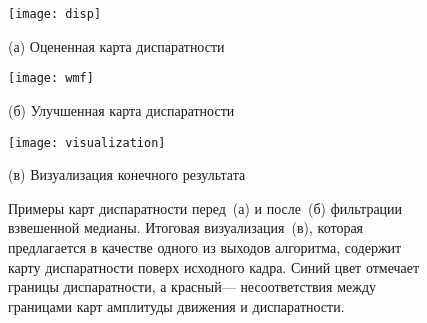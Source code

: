 \begin{figure}[t]
	\begin{minipage}[b]{0.49\linewidth}
		\centering
		\centerline{ \texttt{[image: disp]} }
		\centerline{(а) Оцененная карта диспаратности}\medskip
	\end{minipage}
	\hfill
	\begin{minipage}[b]{0.49\linewidth}
		\centering
		\centerline{\texttt{[image: wmf]} }
		\centerline{(б) Улучшенная карта диспаратности}\medskip
	\end{minipage}
	\begin{minipage}[b]{1\linewidth}
		\centering
		\centerline{\texttt{[image: visualization]} }
		\centerline{(в) Визуализация конечного результата}
	\end{minipage}
    \caption{Примеры карт диспаратности перед~(а) и после~(б) фильтрации 
    	взвешенной медианы. Итоговая визуализация~(в), которая предлагается
    	в качестве одного из выходов алгоритма, содержит карту диспаратности поверх 
    	исходного кадра. Синий цвет отмечает границы диспаратности, а красный---
    	несоответствия между границами карт  амплитуды движения и диспаратности.}
	\label{fig:disp}
\end{figure}

